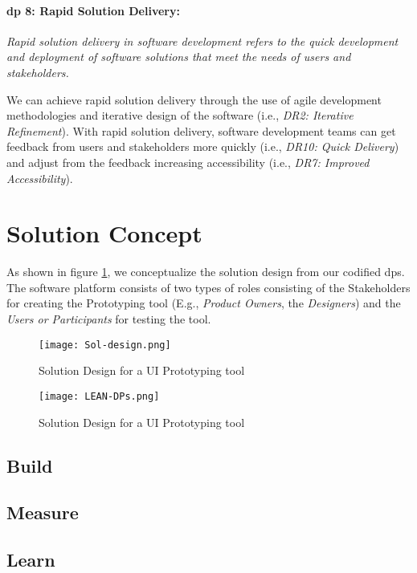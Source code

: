 \paragraph{\ac{dp} 8: Rapid Solution Delivery:} \textit{Rapid solution delivery in software development refers to the quick development and deployment of software solutions that meet the needs of users and stakeholders.}

We can achieve rapid solution delivery through the use of agile development methodologies and iterative design of the software (i.e., \textit{DR2: Iterative Refinement}).
With rapid solution delivery, software development teams can get feedback from users and stakeholders more quickly (i.e., \textit{DR10: Quick Delivery}) and adjust from the feedback increasing accessibility (i.e., \textit{DR7: Improved Accessibility}).

\clearpage
\section{Solution Concept}
\label{design:section:solutionconcept}
As shown in figure \ref{fig:design:solutiondesign}, we conceptualize the solution design from our codified \ac{dp}s.
The software platform consists of two types of roles consisting of the Stakeholders for creating the Prototyping tool (E.g., \textit{Product Owners}, the \textit{Designers}) and the \textit{Users or Participants} for testing the tool.
\begin{figure}[htbp!]
  \centering    
  \texttt{[image: Sol-design.png]}
  \caption[Solution Design]{Solution Design for a UI Prototyping tool}
  \label{fig:design:solutiondesign}
\end{figure}

\begin{figure}[htbp!]
  \centering    
  \texttt{[image: LEAN-DPs.png]}
  \caption[Solution Design]{Solution Design for a UI Prototyping tool}
  \label{fig:design:lean}
\end{figure}

\subsection{Build}
\label{design:section:build}

\subsection{Measure}
\label{design:section:measure}
\subsection{Learn}
\label{design:section:learn}